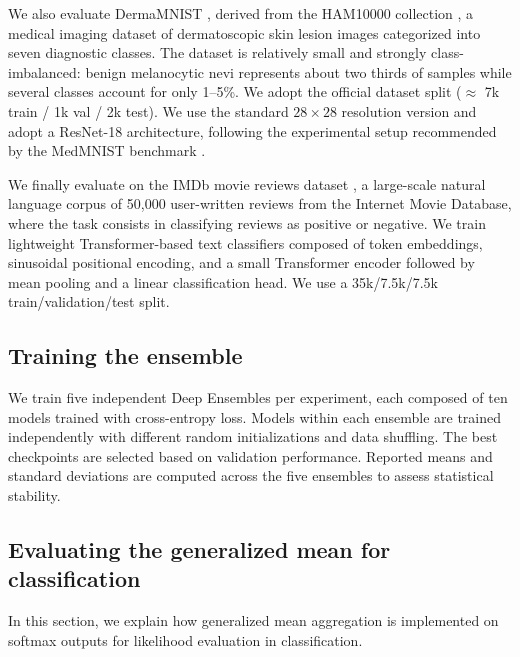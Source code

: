 \documentclass[accepted]{uai2026} %
\begin{document}
We also evaluate DermaMNIST \citep{yang2023medmnist}, derived from the HAM10000 collection \citep{tschandl2018ham10000}, a medical imaging dataset of dermatoscopic skin lesion images categorized into seven diagnostic classes. The dataset is relatively small and strongly class-imbalanced: benign melanocytic nevi represents about two thirds of samples while several classes account for only 1–5\%. We adopt the official dataset split ($\approx$ 7k train / 1k val / 2k test). We use the standard $28\times28$ resolution version and adopt a ResNet-18 architecture, following the experimental setup recommended by the MedMNIST benchmark \citep{yang2023medmnist}.

We finally evaluate on the IMDb movie reviews dataset \citep{maas2011learning}, a large-scale natural language corpus of 50,000 user-written reviews from the Internet Movie Database, where the task consists in classifying reviews as positive or negative. We train lightweight Transformer-based text classifiers composed of token embeddings, sinusoidal positional encoding, and a small Transformer encoder followed by mean pooling and a linear classification head. We use a 35k/7.5k/7.5k train/validation/test split.


\subsection{Training the ensemble}

We train five independent Deep Ensembles \citep{lakshminarayanan2017simple} per experiment, each composed of ten models trained with cross-entropy loss. Models within each ensemble are trained independently with different random initializations and data shuffling. The best checkpoints are selected based on validation performance. Reported means and standard deviations are computed across the five ensembles to assess statistical stability.

\subsection{Evaluating the generalized mean for classification}

In this section, we explain how generalized mean aggregation is implemented on softmax outputs for likelihood evaluation in classification.
\end{document}
